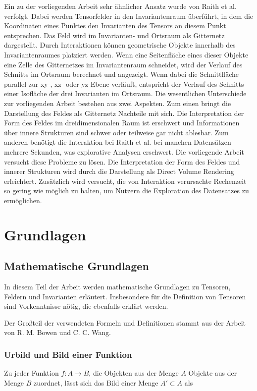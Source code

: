 \documentclass[a4paper,fontsize=12pt,toc=bib,parskip=half,ngerman]{scrartcl}
\begin{document}
Ein zu der vorliegenden Arbeit sehr \"ahnlicher Ansatz wurde von Raith et al. \cite{raith2019tensor} verfolgt. Dabei werden Tensorfelder in den Invariantenraum \"uberf\"uhrt, in dem die Koordinaten eines Punktes den Invarianten des Tensors an diesem Punkt entsprechen. Das Feld wird im Invarianten- und Ortsraum als Gitternetz dargestellt. Durch Interaktionen k\"onnen geometrische Objekte innerhalb des Invariantenraumes platziert werden. Wenn eine Seitenfl\"ache eines dieser Objekte eine Zelle des Gitternetzes im Invariantenraum schneidet, wird der Verlauf des Schnitts im Ortsraum berechnet und angezeigt. Wenn dabei die Schnittfl\"ache parallel zur xy-, xz- oder yz-Ebene verl\"auft, entspricht der Verlauf des Schnitts einer Isofl\"ache der drei Invarianten im Ortsraum. Die wesentlichen Unterschiede zur vorliegenden Arbeit bestehen aus zwei Aspekten. Zum einen bringt die Darstellung des Feldes als Gitternetz Nachteile mit sich. Die Interpretation der Form des Feldes im dreidimensionalen Raum ist erschwert und Informationen \"uber innere Strukturen sind schwer oder teilweise gar nicht ablesbar. Zum anderen ben\"otigt die Interaktion bei Raith et al. bei manchen Datens\"atzen mehrere Sekunden, was explorative Analysen erschwert. Die vorliegende Arbeit versucht diese Probleme zu l\"osen. Die Interpretation der Form des Feldes und innerer Strukturen wird durch die Darstellung als Direct Volume Rendering erleichtert. Zus\"atzlich wird versucht, die von Interaktion verursachte Rechenzeit so gering wie m\"oglich zu halten, um Nutzern die Exploration des Datensatzes zu erm\"oglichen.

\section{Grundlagen}
\label{sec:Grundlagen}
\subsection{Mathematische Grundlagen}
In diesem Teil der Arbeit werden mathematische Grundlagen zu Tensoren, Feldern und Invarianten erl\"autert. Insbesondere f\"ur die Definition von Tensoren sind Vorkenntnisse n\"otig, die ebenfalls erkl\"art werden. 

Der Gro{\ss}teil der verwendeten Formeln und Definitionen stammt aus der Arbeit von R. M. Bowen und C. C. Wang\cite{bowen2008introduction}.

\subsubsection{Urbild und Bild einer Funktion}
Zu jeder Funktion $f: A \rightarrow B$, die Objekten aus der Menge $A$ Objekte aus der Menge  $B$ zuordnet, l\"asst sich das Bild einer Menge $A' \subset A$ als
\end{document}
